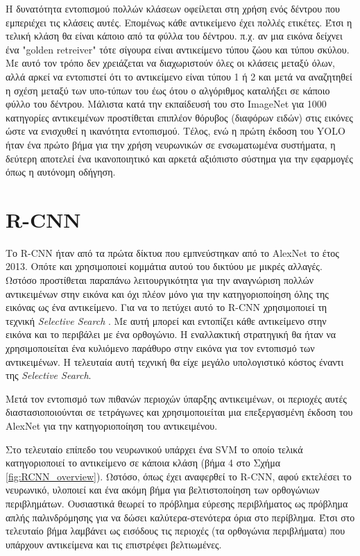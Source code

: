 Η δυνατότητα εντοπισμού πολλών κλάσεων οφείλεται στη χρήση ενός δέντρου που εμπεριέχει τις κλάσεις αυτές. Επομένως κάθε αντικείμενο έχει πολλές ετικέτες. Έτσι η τελική κλάση θα είναι κάποιο από τα φύλλα του δέντρου. π.χ. αν μια εικόνα δείχνει ένα "golden retreiver" τότε σίγουρα είναι αντικείμενο τύπου ζώου και τύπου σκύλου.
Με αυτό τον τρόπο δεν χρειάζεται να διαχωριστούν όλες οι κλάσεις μεταξύ όλων, αλλά αρκεί να εντοπιστεί ότι το αντικείμενο είναι τύπου 1 ή 2 και μετά να αναζητηθεί η σχέση μεταξύ των υπο-τύπων του έως ότου ο αλγόριθμος καταλήξει σε κάποιο φύλλο του δέντρου. Μάλιστα κατά την εκπαίδευσή του στο ImageNet για 1000 κατηγορίες αντικειμένων προστίθεται επιπλέον θόρυβος (διαφόρων ειδών) στις εικόνες ώστε να ενισχυθεί η ικανότητα εντοπισμού.
Τέλος, ενώ η πρώτη έκδοση του YOLO ήταν ένα πρώτο βήμα για την χρήση νευρωνικών σε ενσωματωμένα συστήματα, η δεύτερη αποτελεί ένα ικανοποιητικό και αρκετά αξιόπιστο σύστημα για την εφαρμογές όπως η αυτόνομη οδήγηση.

\section{R-CNN \cite{10}}

Το R-CNN ήταν από τα πρώτα δίκτυα που εμπνεύστηκαν από το AlexNet το έτος 2013. Οπότε και χρησιμοποιεί κομμάτια αυτού του δικτύου με μικρές αλλαγές. Ωστόσο προστίθεται παραπάνω λειτουργικότητα για την αναγνώριση πολλών αντικειμένων στην εικόνα και όχι πλέον μόνο για την κατηγοριοποίηση όλης της εικόνας ως ένα αντικείμενο. Για να το πετύχει αυτό το R-CNN χρησιμοποιεί τη τεχνική \textit{Selective Search} \cite{25}. Με αυτή μπορεί και εντοπίζει κάθε αντικείμενο στην εικόνα και το περιβάλει με ένα ορθογώνιο. Η εναλλακτική στρατηγική θα ήταν να χρησιμοποιείται ένα κυλιόμενο παράθυρο στην εικόνα για τον εντοπισμό των αντικειμένων. Η τελευταία αυτή τεχνική θα είχε μεγάλο υπολογιστικό κόστος έναντι της \textit{Selective Search}.

Μετά τον εντοπισμό των πιθανών περιοχών ύπαρξης αντικειμένων, οι περιοχές αυτές διαστασιοποιούνται σε τετράγωνες και χρησιμοποιείται μια επεξεργασμένη έκδοση του AlexNet για την κατηγοριοποίηση του αντικειμένου.

Στο τελευταίο επίπεδο του νευρωνικού υπάρχει ένα SVM το οποίο τελικά κατηγοριοποιεί το αντικείμενο σε κάποια κλάση (βήμα 4 στο Σχήμα \ref{fig:RCNN_overview}). Ωστόσο, όπως έχει αναφερθεί το R-CNN, αφού εκτελέσει το νευρωνικό, υλοποιεί και ένα ακόμη βήμα για βελτιστοποίηση των ορθογώνιων περιβλημάτων. Ουσιαστικά θεωρεί το πρόβλημα εύρεσης περιβλήματος ως πρόβλημα απλής παλινδρόμησης για να δώσει καλύτερα-στενότερα όρια στο περίβλημα. Έτσι στο τελευταίο βήμα λαμβάνει ως εισόδους τις περιοχές (τα ορθογώνια περιβλήματα) που υπάρχουν αντικείμενα και τις επιστρέφει βελτιωμένες.

